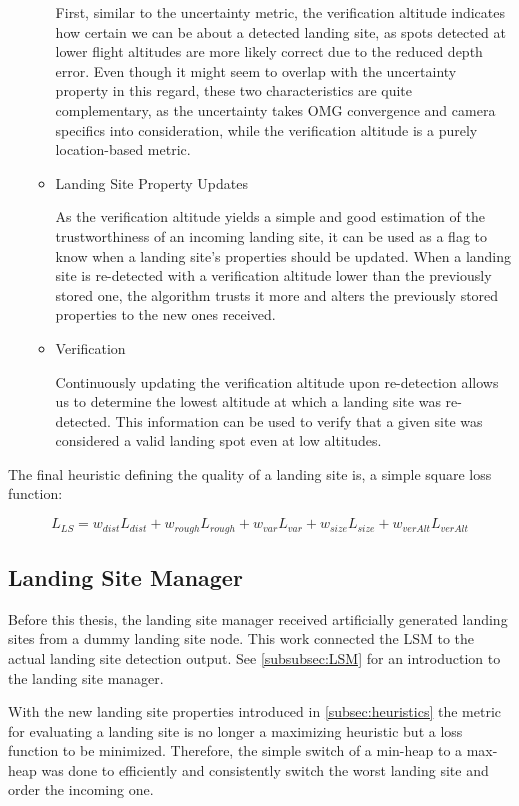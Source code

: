\begin{itemize}
\begin{itemize}
        First, similar to the uncertainty metric, the verification altitude indicates how certain we can be about a detected landing site, as spots detected at lower flight altitudes are more likely correct due to the reduced depth error. Even though it might seem to overlap with the uncertainty property in this regard, these two characteristics are quite complementary, as the uncertainty takes OMG convergence and camera specifics into consideration, while the verification altitude is a purely location-based metric.
        \clearpage %
        \item Landing Site Property Updates

        As the verification altitude yields a simple and good estimation of the trustworthiness of an incoming landing site, it can be used as a flag to know when a landing site's properties should be updated. When a landing site is re-detected with a verification altitude lower than the previously stored one, the algorithm trusts it more and alters the previously stored properties to the new ones received.
        \item Verification

        Continuously updating the verification altitude upon re-detection allows us to determine the lowest altitude at which a landing site was re-detected. This information can be used to verify that a given site was considered a valid landing spot even at low altitudes. 
    \end{itemize}
\end{itemize}

The final heuristic defining the quality of a landing site is, a simple square loss function:

\begin{equation}
    L_{LS} = w_{dist}L_{dist} + w_{rough}L_{rough} + w_{var}L_{var} + w_{size}L_{size} + w_{verAlt}L_{verAlt}
    \label{eq:loss_fct}
\end{equation}


\subsection{Landing Site Manager}

Before this thesis, the landing site manager received artificially generated landing sites from a dummy landing site node. This work connected the LSM to the actual landing site detection output. See \cref{subsubsec:LSM} for an introduction to the landing site manager.

With the new landing site properties introduced in \cref{subsec:heuristics} the metric for evaluating a landing site is no longer a maximizing heuristic but a loss function to be minimized. Therefore, the simple switch of a min-heap to a max-heap was done to efficiently and consistently switch the worst landing site and order the incoming one.

